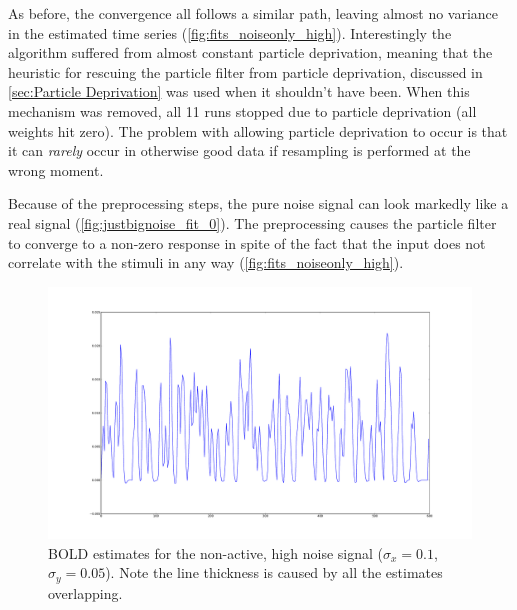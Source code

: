 As before, the convergence all follows a similar path, leaving almost no
variance in the estimated time series (\autoref{fig:fits_noiseonly_high}).
Interestingly the algorithm suffered from almost constant particle deprivation,
meaning that the heuristic
for rescuing the particle filter from particle deprivation, discussed in
\autoref{sec:Particle Deprivation} was used when it shouldn't have been.
 When this mechanism
was removed, all 11 runs stopped due to particle deprivation (all weights hit zero).
The problem with allowing particle deprivation to occur is that it can \emph{rarely}
occur in otherwise good data if resampling is performed at the wrong moment.

Because of the preprocessing steps, the pure noise signal can look markedly like a real
signal (\autoref{fig:justbignoise_fit_0}). The preprocessing causes the particle filter
to converge to a non-zero response in spite of the fact that the input does not correlate
with the stimuli in any way (\autoref{fig:fits_noiseonly_high}).

\begin{figure}[H]
\centering
\includegraphics[clip=true,trim=6cm 2cm 5cm 3cm,width=15cm]{images/fits_noiseonly_high}
\caption[Results for non-active, high noise signal.]
{\ac{BOLD} estimates for the non-active, high noise signal ($\sigma_x = 0.1$, $\sigma_y = 0.05$). 
Note the line thickness is caused by all the estimates overlapping.}
\label{fig:fits_noiseonly_high}
\end{figure}

